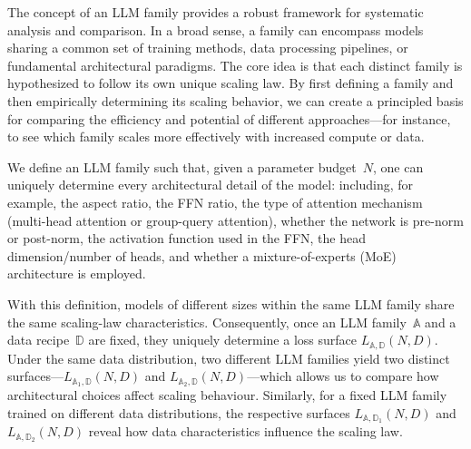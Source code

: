 \documentclass{article}
\begin{document}
The concept of an LLM family provides a robust framework for systematic analysis and comparison. In a broad sense, a family can encompass models sharing a common set of training methods, data processing pipelines, or fundamental architectural paradigms. The core idea is that each distinct family is hypothesized to follow its own unique scaling law. By first defining a family and then empirically determining its scaling behavior, we can create a principled basis for comparing the efficiency and potential of different approaches—for instance, to see which family scales more effectively with increased compute or data.

We define an LLM family such that, given a parameter budget~$N$, one can uniquely determine every architectural detail of the model: including, for example, the aspect ratio, the FFN ratio, the type of attention mechanism (multi-head attention or group-query attention), whether the network is pre-norm or post-norm, the activation function used in the FFN, the head dimension/number of heads, and whether a mixture-of-experts (MoE) architecture is employed.  

With this definition, models of different sizes within the same LLM family share the same scaling-law characteristics.  
Consequently, once an LLM family~$\mathbb{A}$ and a data recipe~$\mathbb{D}$ are fixed, they uniquely determine a loss surface $L_{\mathbb{A},\mathbb{D}}(N, D)$.  
Under the same data distribution, two different LLM families yield two distinct surfaces—$L_{\mathbb{A}_1,\mathbb{D}}(N, D)$ and $L_{\mathbb{A}_2,\mathbb{D}}(N, D)$—which allows us to compare how architectural choices affect scaling behaviour.  
Similarly, for a fixed LLM family trained on different data distributions, the respective surfaces $L_{\mathbb{A},\mathbb{D}_1}(N, D)$ and $L_{\mathbb{A},\mathbb{D}_2}(N, D)$ reveal how data characteristics influence the scaling law.
\end{document}
